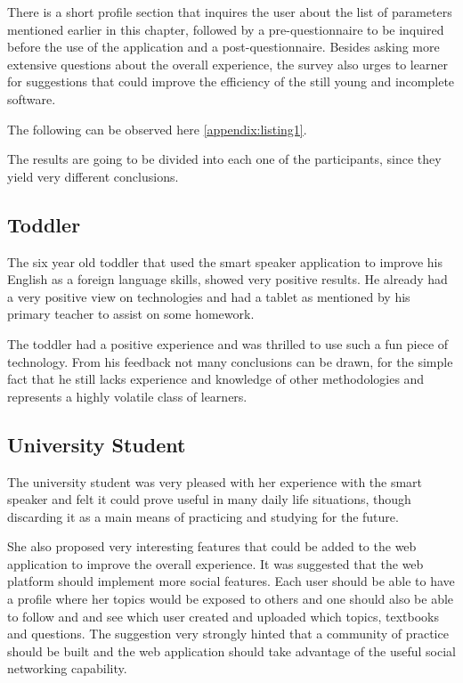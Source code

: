 There is a short profile section that inquires the user about the list of 
parameters mentioned earlier in this chapter, followed by a pre-questionnaire
to be inquired before the use of the application 
and a post-questionnaire. Besides asking more extensive questions about the
overall experience, the survey also urges to learner for suggestions that could
improve the efficiency of the still young and incomplete software.

The following can be observed here \ref{appendix:listing1}.


The results are going to be divided into each one of the participants, since 
they yield very different conclusions.



\subsection{Toddler}
The six year old toddler that used the smart speaker application to improve
his English as a foreign language skills, showed very positive results. He
already had a very positive view on technologies and had a tablet as mentioned
by his primary teacher to assist on some homework. 

The toddler had a positive experience and was thrilled to use such a fun piece
of technology. From his feedback not many conclusions can be drawn, for the simple
fact that he still lacks experience and knowledge of other methodologies and
represents a highly volatile class of learners.

\subsection{University Student}
The university student was very pleased with her experience with the smart speaker
and felt it could prove useful in many daily life situations, though discarding it as a 
main means of practicing and studying for the future.

She also proposed very interesting features that could be added to the web application
to improve the overall experience. It was suggested that the web platform should implement
more social features. Each user should be able to have a profile where her topics would be exposed to 
others and one should also be able to follow and and see which user created and uploaded which topics,
textbooks and questions. The suggestion very strongly hinted that a community of practice should
be built and the web application should take advantage of the useful social networking capability.


